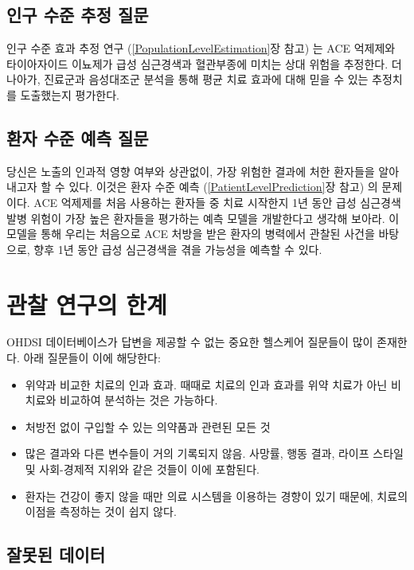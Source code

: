 \documentclass[11pt]{book}
\providecommand{\tightlist}{%
  \setlength{\itemsep}{0pt}\setlength{\parskip}{0pt}}
\theoremstyle{definition}
\theoremstyle{definition}
\theoremstyle{definition}
\theoremstyle{remark}
\begin{document}
\subsection{인구 수준 추정 질문}\label{---}

인구 수준 효과 추정 연구 (\ref{PopulationLevelEstimation}장 참고) 는 ACE
억제제와 타이아자이드 이뇨제가 급성 심근경색과 혈관부종에 미치는 상대
위험을 추정한다. 더 나아가, 진료군과 음성대조군 분석을 통해 평균 치료
효과에 대해 믿을 수 있는 추정치를 도출했는지 평가한다.

\subsection{환자 수준 예측 질문}\label{---}

당신은 노출의 인과적 영향 여부와 상관없이, 가장 위험한 결과에 처한
환자들을 알아내고자 할 수 있다. 이것은 환자 수준 예측
(\ref{PatientLevelPrediction}장 참고) 의 문제이다. ACE 억제제를 처음
사용하는 환자들 중 치료 시작한지 1년 동안 급성 심근경색 발병 위험이 가장
높은 환자들을 평가하는 예측 모델을 개발한다고 생각해 보아라. 이 모델을
통해 우리는 처음으로 ACE 처방을 받은 환자의 병력에서 관찰된 사건을
바탕으로, 향후 1년 동안 급성 심근경색을 겪을 가능성을 예측할 수 있다.

\section{관찰 연구의 한계}\label{--}


OHDSI 데이터베이스가 답변을 제공할 수 없는 중요한 헬스케어 질문들이 많이
존재한다. 아래 질문들이 이에 해당한다:

\begin{itemize}
\tightlist
\item
  위약과 비교한 치료의 인과 효과. 때때로 치료의 인과 효과를 위약 치료가
  아닌 비치료와 비교하여 분석하는 것은 가능하다.
\item
  처방전 없이 구입할 수 있는 의약품과 관련된 모든 것
\item
  많은 결과와 다른 변수들이 거의 기록되지 않음. 사망률, 행동 결과,
  라이프 스타일 및 사회-경제적 지위와 같은 것들이 이에 포함된다.
\item
  환자는 건강이 좋지 않을 때만 의료 시스템을 이용하는 경향이 있기
  때문에, 치료의 이점을 측정하는 것이 쉽지 않다.
\end{itemize}

\subsection{잘못된 데이터}\label{-}
\end{document}
